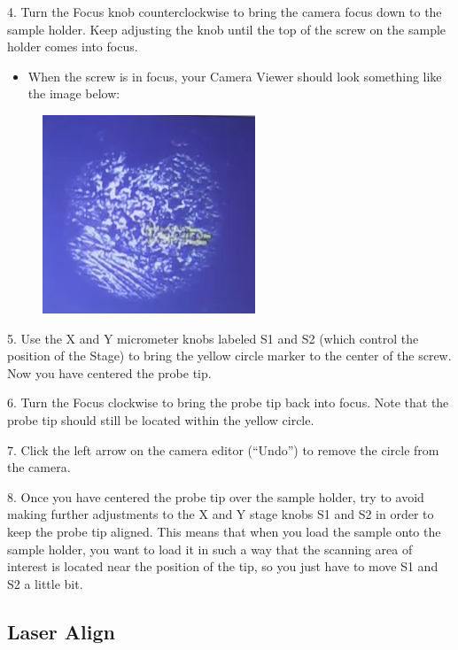 \documentclass{../lab}
\begin{document}
4.  Turn the Focus knob counterclockwise to bring the camera focus down to the sample holder.  Keep adjusting the knob until the top of the screw on the sample holder comes into focus.

\begin{itemize}
    \item When the screw is in focus, your Camera Viewer should look something like the image below:

\end{itemize}

\begin{figure}[h]
    \centering
    \href{http://experimentationlab.berkeley.edu/sites/default/files/AFMImages/sampleholder.PNG}{\includegraphics[width=0.5\linewidth]{images/sampleholder.PNG}}
    \caption{}
    \label{fig:sampleholder}
\end{figure}

5.  Use the X and Y micrometer knobs labeled S1 and S2 (which control the position of the Stage) to bring the yellow circle marker to the center of the screw.  Now you have centered the probe tip.

6.  Turn the Focus clockwise to bring the probe tip back into focus.  Note that the probe tip should still be located within the yellow circle.

7.  Click the left arrow on the camera editor (``Undo'') to remove the circle from the camera.

8.  Once you have centered the probe tip over the sample holder, try to avoid making further adjustments to the X and Y stage knobs S1 and S2 in order to keep the probe tip aligned.  This means that when you load the sample onto the sample holder, you want to load it in such a way that the scanning area of interest is located near the position of the tip, so you just have to move S1 and S2 a little bit.

\subsection{Laser Align}
\end{document}
